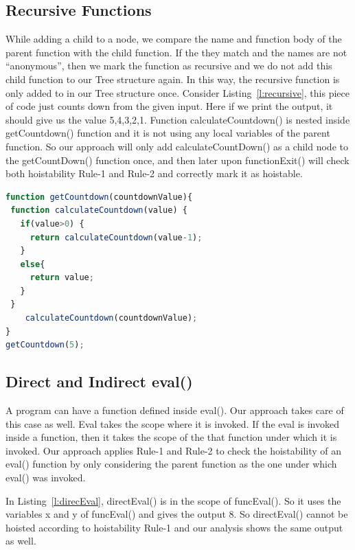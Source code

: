 \documentclass[authoryear,preprint]{sigplanconf}
\begin{document}
\subsection{Recursive Functions}
While adding a child to a node, we compare the name and function body of the parent function with the child function. If the they match and the names are not \enquote{anonymous}, then we mark the function as recursive and we do not add this child function to our Tree structure again. In this way, the recursive function is only added to in our Tree structure once. 
Consider Listing~\ref{l:recursive}, this piece of code just counts down from the given input. Here if we print the output, it should give us the value 5,4,3,2,1. Function calculateCountdown() is nested inside getCountdown() function and it is not using any local variables of the parent function. So our approach will only add calculateCountDown() as a child node to the getCountDown() function once, and then later upon functionExit() will check both hoistability Rule-1 and Rule-2 and correctly mark it as hoistable. 

\lstset{numbers=left, numberstyle=\tiny, stepnumber=1, numbersep=5pt}
\lstset{basicstyle=\ttfamily}
\lstset{frame=tb, frame=bottomline}

\begin{lstlisting}[float,caption=Recursive Functions ,label=l:recursive,language=JavaScript]
function getCountdown(countdownValue){
 function calculateCountdown(value) {
   if(value>0) {
     return calculateCountdown(value-1);
   } 
   else{
     return value;
   }
 }
    calculateCountdown(countdownValue);
}
getCountdown(5);

\end{lstlisting} 


\subsection{Direct and Indirect eval()}
A program can have a function defined inside eval(). Our approach takes care of this case as well. Eval takes the scope where it is invoked. If the eval is invoked inside a function, then it takes the scope of the that function under which it is invoked. Our approach applies Rule-1 and Rule-2 to check the hoistability of an eval() function by only considering the parent function as the one under which eval() was invoked.\par
In Listing~\ref{l:direcEval}, directEval() is in the scope of funcEval(). So it uses the variables x and y of funcEval() and gives the output 8.  So directEval() cannot be hoisted according to hoistability Rule-1 and our analysis shows the same output as well.
\end{document}
